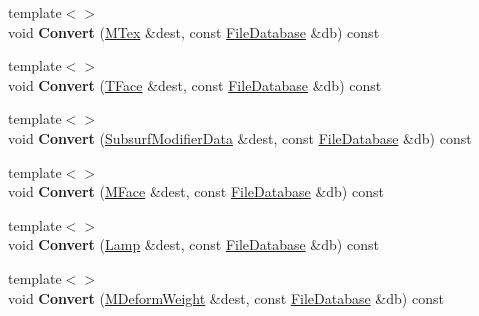 \begin{DoxyCompactItemize}
\item 
\hypertarget{class_assimp_1_1_blender_1_1_structure_a3b85a55ba081811b36fa662be68d31f4}{{\footnotesize template$<$$>$ }\\void {\bfseries Convert} (\hyperlink{struct_assimp_1_1_blender_1_1_m_tex}{M\+Tex} \&dest, const \hyperlink{class_assimp_1_1_blender_1_1_file_database}{File\+Database} \&db) const }\label{class_assimp_1_1_blender_1_1_structure_a3b85a55ba081811b36fa662be68d31f4}

\item 
\hypertarget{class_assimp_1_1_blender_1_1_structure_ad97f92c30d6efb4e5283878ee9a62377}{{\footnotesize template$<$$>$ }\\void {\bfseries Convert} (\hyperlink{struct_assimp_1_1_blender_1_1_t_face}{T\+Face} \&dest, const \hyperlink{class_assimp_1_1_blender_1_1_file_database}{File\+Database} \&db) const }\label{class_assimp_1_1_blender_1_1_structure_ad97f92c30d6efb4e5283878ee9a62377}

\item 
\hypertarget{class_assimp_1_1_blender_1_1_structure_a6f03fc525e520cbdb9d7cbe163cd4bf9}{{\footnotesize template$<$$>$ }\\void {\bfseries Convert} (\hyperlink{struct_assimp_1_1_blender_1_1_subsurf_modifier_data}{Subsurf\+Modifier\+Data} \&dest, const \hyperlink{class_assimp_1_1_blender_1_1_file_database}{File\+Database} \&db) const }\label{class_assimp_1_1_blender_1_1_structure_a6f03fc525e520cbdb9d7cbe163cd4bf9}

\item 
\hypertarget{class_assimp_1_1_blender_1_1_structure_ae8c0618d29d7248c4bc717208c2acd89}{{\footnotesize template$<$$>$ }\\void {\bfseries Convert} (\hyperlink{struct_assimp_1_1_blender_1_1_m_face}{M\+Face} \&dest, const \hyperlink{class_assimp_1_1_blender_1_1_file_database}{File\+Database} \&db) const }\label{class_assimp_1_1_blender_1_1_structure_ae8c0618d29d7248c4bc717208c2acd89}

\item 
\hypertarget{class_assimp_1_1_blender_1_1_structure_a6e664d402158b3459b3b8b59d1771eef}{{\footnotesize template$<$$>$ }\\void {\bfseries Convert} (\hyperlink{struct_assimp_1_1_blender_1_1_lamp}{Lamp} \&dest, const \hyperlink{class_assimp_1_1_blender_1_1_file_database}{File\+Database} \&db) const }\label{class_assimp_1_1_blender_1_1_structure_a6e664d402158b3459b3b8b59d1771eef}

\item 
\hypertarget{class_assimp_1_1_blender_1_1_structure_af69c80ce06dcd279283831f46133cbc9}{{\footnotesize template$<$$>$ }\\void {\bfseries Convert} (\hyperlink{struct_assimp_1_1_blender_1_1_m_deform_weight}{M\+Deform\+Weight} \&dest, const \hyperlink{class_assimp_1_1_blender_1_1_file_database}{File\+Database} \&db) const }\label{class_assimp_1_1_blender_1_1_structure_af69c80ce06dcd279283831f46133cbc9}


\end{DoxyCompactItemize}
